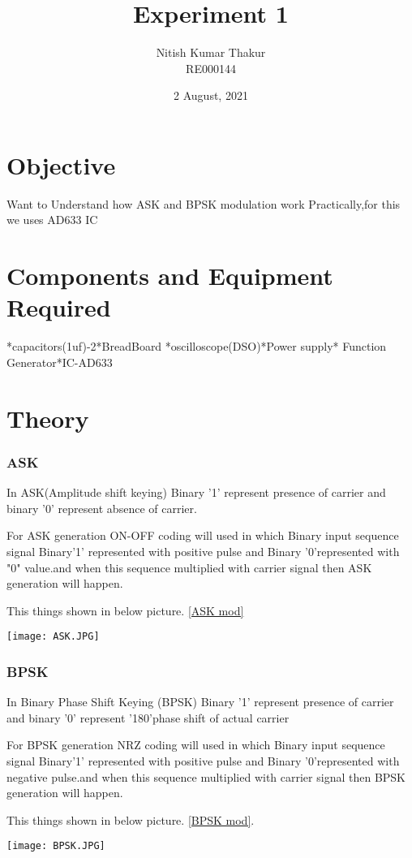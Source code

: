 \documentclass{article}
\title{Experiment 1}
\author{Nitish Kumar Thakur \\ RE000144 }
\date{2 August, 2021}
\begin{document}
\maketitle

\section{Objective}
Want to Understand how ASK and BPSK modulation work Practically,for this we uses AD633 IC

\section{Components and Equipment Required}                    *capacitors(1uf)-2*BreadBoard *oscilloscope(DSO)*Power supply* Function Generator*IC-AD633 
 
\section{Theory}
\subsubsection{ASK}
In ASK(Amplitude shift keying) Binary '1' represent presence of carrier and binary '0' represent absence of carrier.\par
For ASK generation ON-OFF coding will used in which Binary input sequence signal Binary'1' represented with positive pulse and Binary '0'represented with "0" value.and when this sequence multiplied with carrier signal then ASK generation will happen. \par
This things shown in below picture. \ref{ASK mod}
\begin{figure*}[h]
	\centering
	\texttt{[image: ASK.JPG]}
	\caption{ASK modulation representation}
	\label{ASK mod}
\end{figure*}

\subsubsection{BPSK}
In Binary Phase Shift Keying (BPSK)  Binary '1' represent presence of carrier and binary '0' represent '180'phase shift of actual carrier \par 
For BPSK generation NRZ coding will used in which Binary input sequence signal Binary'1' represented with positive pulse and Binary '0'represented with negative pulse.and when this sequence multiplied with carrier signal then BPSK  generation will happen.\par
This things shown in below picture. \ref{BPSK mod}.
\begin{figure*}[ht]
	\centering
	\texttt{[image: BPSK.JPG]}
	\caption{BPSK modulation representation}
	\label{BPSK mod}
\end{figure*}
\end{document}
